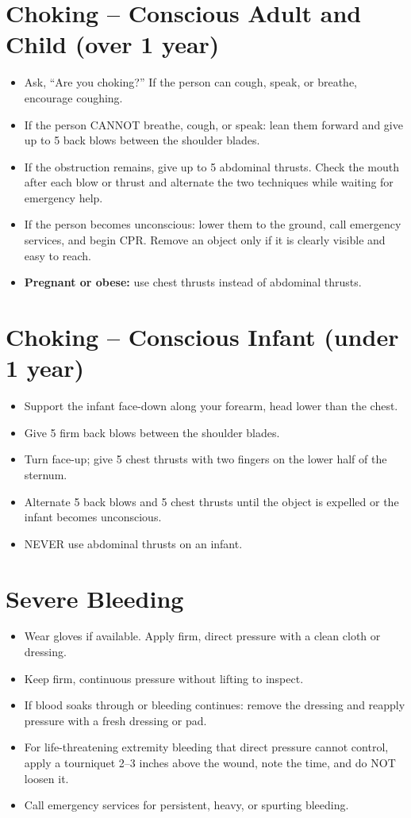 \section{Choking -- Conscious Adult and Child (over 1 year)}

\begin{itemize}[leftmargin=*]
\item Ask, ``Are you choking?'' If the person can cough, speak, or breathe, encourage coughing.
\item If the person CANNOT breathe, cough, or speak: lean them forward and give up to 5 back blows between the shoulder blades.
\item If the obstruction remains, give up to 5 abdominal thrusts. Check the mouth after each blow or thrust and alternate the two techniques while waiting for emergency help.
\item If the person becomes unconscious: lower them to the ground, call emergency services, and begin CPR. Remove an object only if it is clearly visible and easy to reach.
\item \textbf{Pregnant or obese:} use chest thrusts instead of abdominal thrusts.
\end{itemize}

\section{Choking -- Conscious Infant (under 1 year)}

\begin{itemize}
\item Support the infant face-down along your forearm, head lower than the chest.
\item Give 5 firm back blows between the shoulder blades.
\item Turn face-up; give 5 chest thrusts with two fingers on the lower half of the sternum.
\item Alternate 5 back blows and 5 chest thrusts until the object is expelled or the infant becomes unconscious.
\item NEVER use abdominal thrusts on an infant.
\end{itemize}

\section{Severe Bleeding}

\begin{itemize}[leftmargin=*]
\item Wear gloves if available. Apply firm, direct pressure with a clean cloth or dressing.
\item Keep firm, continuous pressure without lifting to inspect.
\item If blood soaks through or bleeding continues: remove the dressing and reapply pressure with a fresh dressing or pad.
\item For life-threatening extremity bleeding that direct pressure cannot control, apply a tourniquet 2--3 inches above the wound, note the time, and do NOT loosen it.
\item Call emergency services for persistent, heavy, or spurting bleeding.
\end{itemize}

